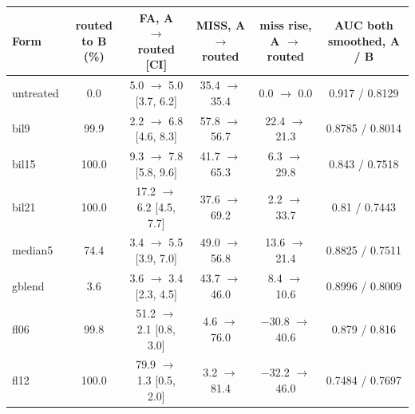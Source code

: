 \begin{tabular}{@{}l c c c c c@{}}
\toprule
Form & routed to B (\%) & FA, A $\rightarrow$ routed [CI] & MISS, A $\rightarrow$ routed & miss rise, A $\rightarrow$ routed & AUC both smoothed, A / B \\
\midrule
untreated & 0.0 & 5.0 $\rightarrow$ 5.0 [3.7, 6.2] & 35.4 $\rightarrow$ 35.4 & 0.0 $\rightarrow$ 0.0 & 0.917 / 0.8129 \\
bil9 & 99.9 & 2.2 $\rightarrow$ 6.8 [4.6, 8.3] & 57.8 $\rightarrow$ 56.7 & 22.4 $\rightarrow$ 21.3 & 0.8785 / 0.8014 \\
bil15 & 100.0 & 9.3 $\rightarrow$ 7.8 [5.8, 9.6] & 41.7 $\rightarrow$ 65.3 & 6.3 $\rightarrow$ 29.8 & 0.843 / 0.7518 \\
bil21 & 100.0 & 17.2 $\rightarrow$ 6.2 [4.5, 7.7] & 37.6 $\rightarrow$ 69.2 & 2.2 $\rightarrow$ 33.7 & 0.81 / 0.7443 \\
median5 & 74.4 & 3.4 $\rightarrow$ 5.5 [3.9, 7.0] & 49.0 $\rightarrow$ 56.8 & 13.6 $\rightarrow$ 21.4 & 0.8825 / 0.7511 \\
gblend & 3.6 & 3.6 $\rightarrow$ 3.4 [2.3, 4.5] & 43.7 $\rightarrow$ 46.0 & 8.4 $\rightarrow$ 10.6 & 0.8996 / 0.8009 \\
fl06 & 99.8 & 51.2 $\rightarrow$ 2.1 [0.8, 3.0] & 4.6 $\rightarrow$ 76.0 & $-$30.8 $\rightarrow$ 40.6 & 0.879 / 0.816 \\
fl12 & 100.0 & 79.9 $\rightarrow$ 1.3 [0.5, 2.0] & 3.2 $\rightarrow$ 81.4 & $-$32.2 $\rightarrow$ 46.0 & 0.7484 / 0.7697 \\
\bottomrule
\end{tabular}

